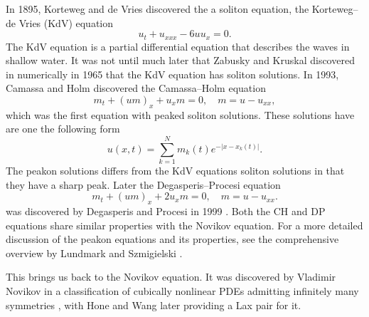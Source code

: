 \documentclass[english,master]{liumaiex}
\theoremstyle{plain}
\theoremstyle{definition}
\begin{document}
In 1895, Korteweg and de Vries discovered the a soliton equation, the Korteweg--de Vries (KdV) equation \sloppy
\begin{equation}
	u_t + u_{xxx} - 6uu_x = 0.	
\end{equation}
The KdV equation is a partial differential equation that describes the waves in shallow water. It was not until much later that Zabusky and Kruskal \cite{Zabusky1965} discovered in numerically in 1965 that the KdV equation has soliton solutions. In 1993, Camassa and Holm discovered the Camassa--Holm \cite{Camassa_1993} equation
\begin{equation} \label{eq:CH}
	m_t + (um)_x + u_xm = 0,\quad m = u - u_{xx},
\end{equation}
which was the first equation with peaked soliton solutions. These solutions have are one the following form
\begin{equation} \label{eq:peakon}
	u(x, t) = \sum_{k = 1}^{N} m_k(t) e^{-|x - x_k(t)|}.
\end{equation}
The peakon solutions differs from the KdV equations soliton solutions in that they have a sharp peak. Later the Degasperis--Procesi equation
\begin{equation} \label{eq:DP}
	m_t + (um)_x + 2u_xm = 0,\quad m = u - u_{xx}.
\end{equation}
was discovered by Degasperis and Procesi in 1999 \cite{Degasperis_1999}. Both the CH and DP equations share similar properties with the Novikov equation. For a more detailed discussion of the peakon equations and its properties, see the comprehensive overview by Lundmark and Szmigielski \cite{Lundmark_2022}.

This brings us back to the Novikov equation. It was discovered by Vladimir Novikov in a classification of cubically nonlinear PDEs admitting infinitely many symmetries \cite{Novikov_2009}, with Hone and Wang \cite{Hone2008} later providing a Lax pair for it.
\end{document}
